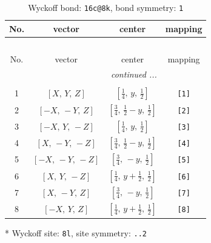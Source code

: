 \documentclass[fleqn,8pt]{jsarticle}
\begin{document}
\renewcommand{\arraystretch}{1.2}
\begin{longtable}{cccc}
\caption{Wyckoff bond: {\tt 16c@8k}, bond symmetry: {\tt 1}}
 \\
 \hline \hline
No. & vector & center & mapping \\ \hline \endfirsthead

\multicolumn{3}{l}{\tablename\ \thetable{}} \\
 \hline \hline
No. & vector & center & mapping \\ \hline \endhead

 \hline \hline
\multicolumn{3}{r}{\footnotesize\it continued ...} \\ \endfoot

 \hline \hline
\multicolumn{3}{r}{} \\ \endlastfoot

1 & $\left[ X,\, Y,\, Z \right]$ & $\left[ \frac{1}{4},\, y,\, \frac{1}{2} \right]$ & {\tt [1]} \\ \hline
2 & $\left[ - X,\, - Y,\, Z \right]$ & $\left[ \frac{3}{4},\, \frac{1}{2} - y,\, \frac{1}{2} \right]$ & {\tt [2]} \\ \hline
3 & $\left[ - X,\, Y,\, - Z \right]$ & $\left[ \frac{1}{4},\, y,\, \frac{1}{2} \right]$ & {\tt [3]} \\ \hline
4 & $\left[ X,\, - Y,\, - Z \right]$ & $\left[ \frac{3}{4},\, \frac{1}{2} - y,\, \frac{1}{2} \right]$ & {\tt [4]} \\ \hline
5 & $\left[ - X,\, - Y,\, - Z \right]$ & $\left[ \frac{3}{4},\, - y,\, \frac{1}{2} \right]$ & {\tt [5]} \\ \hline
6 & $\left[ X,\, Y,\, - Z \right]$ & $\left[ \frac{1}{4},\, y + \frac{1}{2},\, \frac{1}{2} \right]$ & {\tt [6]} \\ \hline
7 & $\left[ X,\, - Y,\, Z \right]$ & $\left[ \frac{3}{4},\, - y,\, \frac{1}{2} \right]$ & {\tt [7]} \\ \hline
8 & $\left[ - X,\, Y,\, Z \right]$ & $\left[ \frac{1}{4},\, y + \frac{1}{2},\, \frac{1}{2} \right]$ & {\tt [8]} \\
\end{longtable}
* Wyckoff site: {\tt 8l}, site symmetry: {\tt ..2}
\renewcommand{\arraystretch}{1.2}
\end{document}
